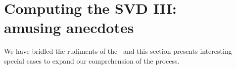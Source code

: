 \chapter[Computing the SVD III]{Computing the SVD III:\\amusing anecdotes}

We have bridled the rudiments of the \asvd \ and this section presents interesting special cases to expand our comprehension of the process.









\endinput